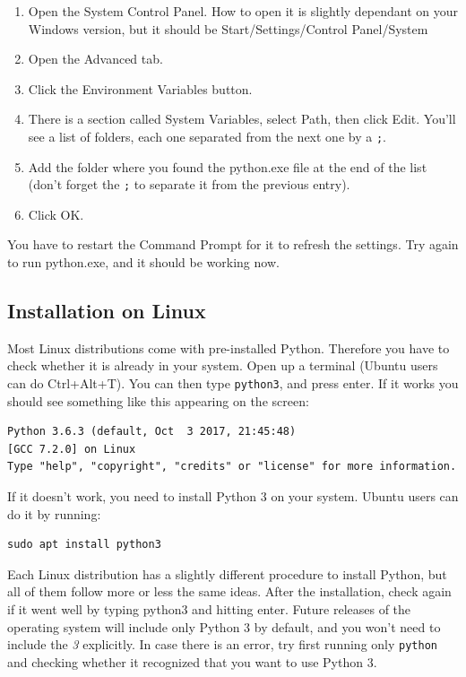 \begin{enumerate}
 \item Open the System Control Panel. How to open it is slightly dependant on your Windows version, but it should be Start/Settings/Control Panel/System
 \item Open the Advanced tab.
 \item Click the Environment Variables button.
 \item There is a section called System Variables, select Path, then click Edit. You'll see a list of folders, each one separated from the next one by a \texttt{;}.
 \item Add the folder where you found the python.exe file at the end of the list (don't forget the \texttt{;} to separate it from the previous entry).
 \item Click OK\@.
\end{enumerate}

You have to restart the Command Prompt for it to refresh the settings. Try again to run python.exe, and it should be working now.

\subsection{Installation on Linux}\label{subsec:installation-on-linux}
Most Linux distributions come with pre-installed Python. Therefore you have to check whether it is already in your system. Open up a terminal (Ubuntu users can do Ctrl+Alt+T). You can then type \texttt{python3}, and press enter. If it works you should see something like this appearing on the screen:

\begin{verbatim}
Python 3.6.3 (default, Oct  3 2017, 21:45:48)
[GCC 7.2.0] on Linux
Type "help", "copyright", "credits" or "license" for more information.
\end{verbatim}

If it doesn't work, you need to install Python 3 on your system. Ubuntu users can do it by running:
\begin{verbatim}
sudo apt install python3
\end{verbatim}

Each Linux distribution has a slightly different procedure to install Python, but all of them follow more or less the same ideas. After the installation, check again if it went well by typing python3 and hitting enter. Future releases of the operating system will include only Python 3 by default, and you won't need to include the \emph{3} explicitly. In case there is an error, try first running only \texttt{python} and checking whether it recognized that you want to use Python 3.

